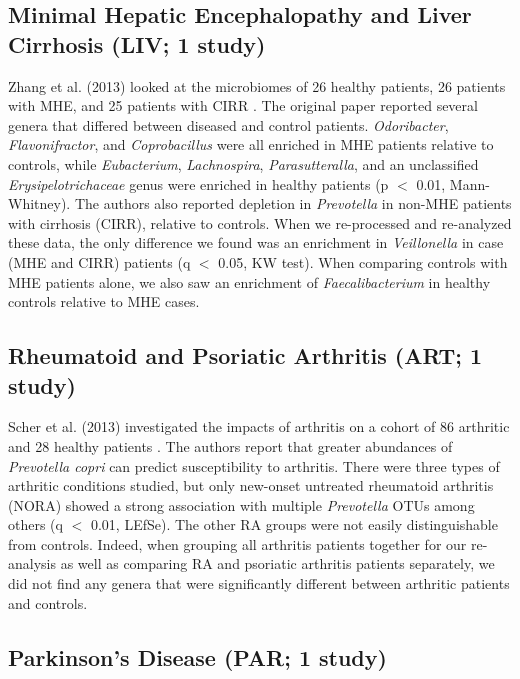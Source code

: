 {\subsection*{Minimal Hepatic Encephalopathy and Liver Cirrhosis (LIV; 1 study)}

Zhang et al. (2013) looked at the microbiomes of 26 healthy patients, 26 patients with MHE, and 25 patients with CIRR \cite{mhe-zhang}.
The original paper reported several genera that differed between diseased and control patients. \textit{Odoribacter}, \textit{Flavonifractor}, and \textit{Coprobacillus} were all enriched in MHE patients relative to controls, while \textit{Eubacterium}, \textit{Lachnospira}, \textit{Parasutteralla}, and an unclassified \textit{Erysipelotrichaceae} genus were enriched in healthy patients (p $<$ 0.01, Mann-Whitney).
The authors also reported depletion in \textit{Prevotella} in non-MHE patients with cirrhosis (CIRR), relative to controls.
When we re-processed and re-analyzed these data, the only difference we found was an enrichment in \textit{Veillonella} in case (MHE and CIRR) patients (q $<$ 0.05, KW test).
When comparing controls with MHE patients alone, we also saw an enrichment of \textit{Faecalibacterium} in healthy controls relative to MHE cases.

\subsection*{Rheumatoid and Psoriatic Arthritis (ART; 1 study)}

Scher et al. (2013) investigated the impacts of arthritis on a cohort of 86 arthritic and 28 healthy patients \cite{ra-littman}.
The authors report that greater abundances of \textit{Prevotella copri} can predict susceptibility to arthritis.
There were three types of arthritic conditions studied, but only new-onset untreated rheumatoid arthritis (NORA) showed a strong association with multiple \textit{Prevotella} OTUs among others (q $<$ 0.01, LEfSe).
The other RA groups were not easily distinguishable from controls.
Indeed, when grouping all arthritis patients together for our re-analysis as well as comparing RA and psoriatic arthritis patients separately, we did not find any genera that were significantly different between arthritic patients and controls.

\subsection*{Parkinson's Disease (PAR; 1 study)}

}

